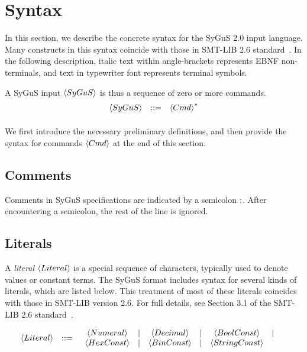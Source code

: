 \documentclass[english,a4paper,10pt]{article}
\begin{document}
\section{Syntax}
\label{sec:syntax}

In this section, we describe the concrete syntax
for the SyGuS 2.0 input language.
Many constructs in this syntax coincide
with those in SMT-LIB 2.6 standard~\cite{BarFT-RR-17}.
In the following description,
italic text within angle-brackets represents EBNF non-terminals,
and text in typewriter font represents terminal symbols.

A SyGuS input $\left\langle SyGuS\right\rangle$ is thus a sequence of zero or more commands.
\[
\begin{array}{rcl}
\left\langle SyGuS\right\rangle & ::= & \left\langle Cmd\right\rangle^{*}\\[2ex]
\end{array}
\]
We first introduce the necessary preliminary definitions,
and then provide the syntax for commands $\left\langle Cmd\right\rangle$ at the end of this section.

\subsection{Comments}

Comments in SyGuS specifications are indicated by a semicolon ${\tt ;}$.
After encountering a semicolon, the rest of the line is ignored.

\subsection{Literals}
\label{ssec:literals}

A \emph{literal} $\left\langle Literal\right\rangle$ is a special sequence of characters,
typically used to denote values or constant terms.
The SyGuS format includes syntax for several kinds of literals,
which are listed below.
This treatment of most of these literals coincides with
those in SMT-LIB version 2.6.
For full details, see Section 3.1 of the SMT-LIB 2.6 standard~\cite{BarFT-RR-17}.

\begin{alignat*}{1}
 & \begin{array}{rcl}
\left\langle Literal\right\rangle & ::= & \begin{array}{ccccccccccc}
\left\langle Numeral\right\rangle & | & \left\langle Decimal\right\rangle & | & \left\langle BoolConst\right\rangle & | \\
\left\langle HexConst\right\rangle & | & \left\langle BinConst\right\rangle & | & \left\langle StringConst\right\rangle\end{array}\\
\end{array}
\end{alignat*}
\end{document}
